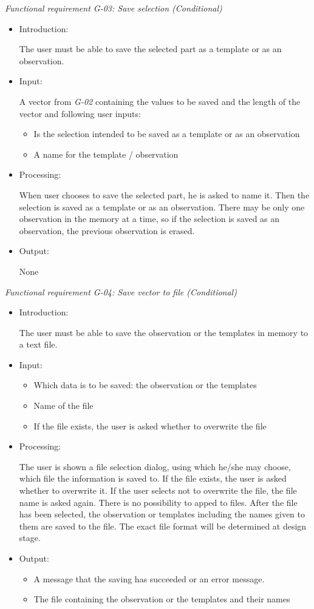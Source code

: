 \documentclass[a4paper,11pt]{article}
\begin{document}
\noindent \emph{Functional requirement G-03: Save selection (Conditional)}
\begin{itemize}
\item Introduction:

The user must be able to save the selected part as a template or as an observation. 
\item Input:

A vector from \emph{G-02} containing the values to be saved and the length of the vector and following user inputs:
\begin{itemize}
\item Is the selection intended to be saved as a template or as an observation
\item A name for the template / observation 
\end{itemize}
\item Processing:

When user chooses to save the selected part, he is asked to name it. Then the selection is saved as a template
or as an observation. There may be only one observation in the memory at a time, so if the selection is saved as
an observation, the previous observation is erased.

\item Output:

None
\end{itemize}


\noindent \emph{Functional requirement G-04: Save vector to file (Conditional)}
\begin{itemize}
\item Introduction:

The user must be able to save the observation or the templates in memory to a text file. 
\item Input:
\begin{itemize}
\item Which data is to be saved: the observation or the templates
\item Name of the file
\item If the file exists, the user is asked whether to overwrite the file
\end{itemize}

\item Processing:

The user is shown a file selection dialog, using which he/she may choose, which file the information is saved to.
If the file exists, the user is asked whether to overwrite it. If the user selects not to overwrite the file, the
file name is asked again. There is no possibility to apped to files. After the file has been selected, the observation
or templates including the names given to them are saved to the file. The exact file format will be determined at design
stage.
\item Output:
\begin{itemize}
\item A message that the saving has succeeded or an error message.
\item The file containing the observation or the templates and their names
\end{itemize}

\end{itemize}
\end{document}
